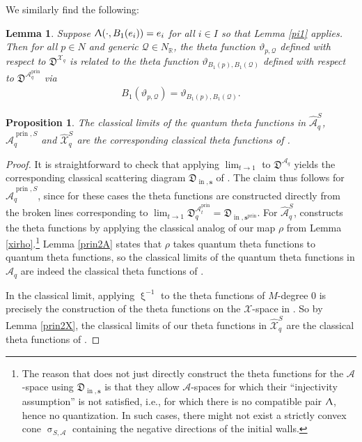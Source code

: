 \documentclass{amsart}
\DeclareMathOperator{\prin}{prin}
\DeclareMathOperator{\In}{in}
\let\bb=\mathbb
\let\rar=\rightarrow
\let\f=\mathfrak
\let\s=\mathcal
\let\wh=\widehat
\newcommand {\sQ} {\mathcal{Q}}
\renewcommand{\xi}{\upxi}
\renewcommand{\sigma}{\upsigma}
\renewcommand{\Lambda}{\Uplambda}
\theoremstyle{plain}%
\newtheorem{lem}[thm]{Lemma}
\newtheorem{prop}[thm]{Proposition}
\theoremstyle{definition}
\theoremstyle{remark}
\begin{document}
We similarly find the following:
\begin{lem}\label{pi1Theta}
Suppose $\Lambda(\cdot,B_1(e_i))=e_i$ for all $i\in I$ so that Lemma \ref{pi1} applies.  Then for all $p\in N$ and generic $\sQ\in N_{\bb{R}}$, the theta function $\vartheta_{p,\sQ}$ defined with respect to $\f{D}^{\s{X}_q}$ is related to the theta function $\vartheta_{B_1(p),B_1(\sQ)}$ defined with respect to $\f{D}^{\s{A}_q^{\prin}}$ via  \begin{align*}
    B_1(\vartheta_{p,\sQ})=\vartheta_{B_1(p),B_1(\sQ)}.
\end{align*}
\end{lem}
\begin{prop}\label{q2classicalTheta}
The classical limits of the quantum theta functions in $\wh{\s{A}}_q^S$, $\wh{\s{A}}^{\prin,S}_q$ and $\wh{\s{X}}_q^S$
are the corresponding classical theta functions of \cite{GHKK}.
\end{prop}
\begin{proof}
It is straightforward to check that applying $\lim_{t\rar 1}$ to $\f{D}^{\s{A}_q}$ yields the corresponding classical scattering diagram $\f{D}_{\In,\textbf{s}}$ of \cite{GHKK}.  The claim thus follows for $\wh{\s{A}}_q^{\prin,S}$, since for these cases the \cite{GHKK} theta functions are constructed directly from the broken lines corresponding to $\lim_{t\rar 1} \f{D}_q^{\s{A}_t^{\prin}}=\f{D}_{\In,\textbf{s}^{\prin}}$.  For $\wh{\s{A}}_q^{S}$, \cite[\S 7.2]{GHKK} constructs the theta functions by applying the classical analog of our map $\rho$ from Lemma \ref{xirho}.\footnote{The reason that \cite{GHKK} does not just directly construct the theta functions for the $\s{A}$-space using $\f{D}_{\In,\textbf{s}}$ is that they allow $\s{A}$-spaces for which their ``injectivity assumption'' is not satisfied, i.e., for which there is no compatible pair $\Lambda$, hence no quantization.  In such cases, there might not exist a strictly convex cone $\sigma_{S,\s{A}}$ containing the negative directions of the initial walls.}  Lemma \ref{prin2A} states that $\rho$ takes quantum theta functions to quantum theta functions, so the classical limits of the quantum theta functions in $\wh{\s{A}}_q$ are indeed the classical theta functions of \cite{GHKK}.

In the classical limit, applying $\xi^{-1}$ to the theta functions of $M$-degree $0$ is precisely the construction of the theta functions on the $\s{X}$-space in \cite[Constr. 7.11]{GHKK}.  So by Lemma \ref{prin2X}, the classical limits of our theta functions in $\wh{\s{X}}^S_q$ are the classical theta functions of \cite{GHKK}.
\end{proof}
\end{document}
